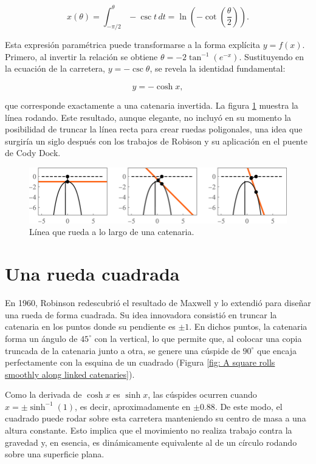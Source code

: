 \documentclass{IEEEtran}
\begin{document}
\[
x(\theta) = \int_{-\pi/2}^{\theta} -\csc t \, dt = \ln\left(-\cot\left(\frac{\theta}{2}\right)\right).
\]

Esta expresión paramétrica puede transformarse a la forma explícita $y = f(x)$. Primero, al invertir la relación se obtiene $\theta = -2 \tan^{-1}(e^{-x})$. Sustituyendo en la ecuación de la carretera, $y = -\csc \theta$, se revela la identidad fundamental:

\[
y = -\cosh x,
\]

que corresponde exactamente a una catenaria invertida. La figura \ref{fig: A line rolling along a catenary} muestra la línea rodando. Este resultado, aunque elegante, no incluyó en su momento la posibilidad de truncar la línea recta para crear ruedas poligonales, una idea que surgiría un siglo después con los trabajos de Robison y su aplicación en el puente de Cody Dock.

\begin{figure}[h]
    \centering
    \includegraphics[width = 0.5 \textwidth]{Imagenes/A line rolling along a catenary.png}
    \caption{Línea que rueda a lo largo de una catenaria.}
    \label{fig: A line rolling along a catenary}
\end{figure}

\section{Una rueda cuadrada}

En 1960, Robinson redescubrió el resultado de Maxwell y lo extendió para diseñar una rueda de forma cuadrada. Su idea innovadora consistió en truncar la catenaria en los puntos donde su pendiente es $\pm 1$. En dichos puntos, la catenaria forma un ángulo de $45^\circ$ con la vertical, lo que permite que, al colocar una copia truncada de la catenaria junto a otra, se genere una cúspide de $90^\circ$ que encaja perfectamente con la esquina de un cuadrado (Figura \ref{fig: A square rolls smoothly along linked catenaries}).

Como la derivada de $\cosh x$ es $\sinh x$, las cúspides ocurren cuando $x = \pm \sinh^{-1}(1)$, es decir, aproximadamente en $\pm 0.88$. De este modo, el cuadrado puede rodar sobre esta carretera manteniendo su centro de masa a una altura constante. Esto implica que el movimiento no realiza trabajo contra la gravedad y, en esencia, es dinámicamente equivalente al de un círculo rodando sobre una superficie plana.
\end{document}

